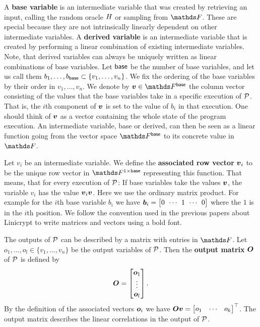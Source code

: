 A \textbf{base variable} is an intermediate variable that was created by retrieving an input,
calling the random oracle $\H$ or sampling from $\F$.
These are special because they are not intrinsically linearly dependent on other intermediate variables.
A \textbf{derived variable} is an intermediate variable that is created by performing a linear combination of existing intermediate variables.
Note, that derived variables can always be uniquely written as linear combinations of base variables.
Let $\base$ be the number of base variables,
and let us call them $\dts b \base \subset \{\dts v n\}$.
We fix the ordering of the base variables by their order in $v_1, \dots, v_n$.
We denote by $\vbase \in \Base$ the column vector
consisting of the values that the base variables take in a specific execution of $\P$.
That is, the $i$th component of $\vbase$ is set to the value of $b_i$ in that execution.
One should think of $\vbase$ as a vector containing the whole state of the program execution.
An intermediate variable, base or derived,
can then be seen as a linear function going from the vector space $\Fsp$ to its concrete value in $\F$.

Let $v_i$ be an intermediate variable.
We define the \textbf{associated row vector} $\v v_i$ to be the unique row vector in $\Frowsp$ representing this function.
That means, that for every execution of $\P$:
If base variables take the values $\vbase$,
the variable $v_i$ has the value $\vv_i \vbase$.
Here we use the ordinary matrix product.
For example for the $i$th base variable $b_i$ we have 
$\v b_i = \m{0 & \cdots & 1 & \cdots & 0}$
where the $1$ is in the $i$th position.
We follow the convention used in the previous papers about Linicrypt to write matrices and vectors using a bold font.

The outputs of $\P$ can be described by a matrix with entries in $\F$.
Let $o_1, \dots, o_l \in \{v_1, \dots, v_n \}$ be the output variables of $\P$.
Then the \textbf{output matrix} $\O$ of $\P$ is defined by
\[
  \O =
  \begin{bmatrix}
  \v o_1\\
  \vdots \\
  \v o_l
  \end{bmatrix}.
\]
By the definition of the associated vectors $\v o_i$ we have
$
\O \vbase = 
  \begin{bmatrix} o_1 & \cdots & o_k \end{bmatrix}^\top
$.
The output matrix describes the linear correlations in the output of $\P$.

